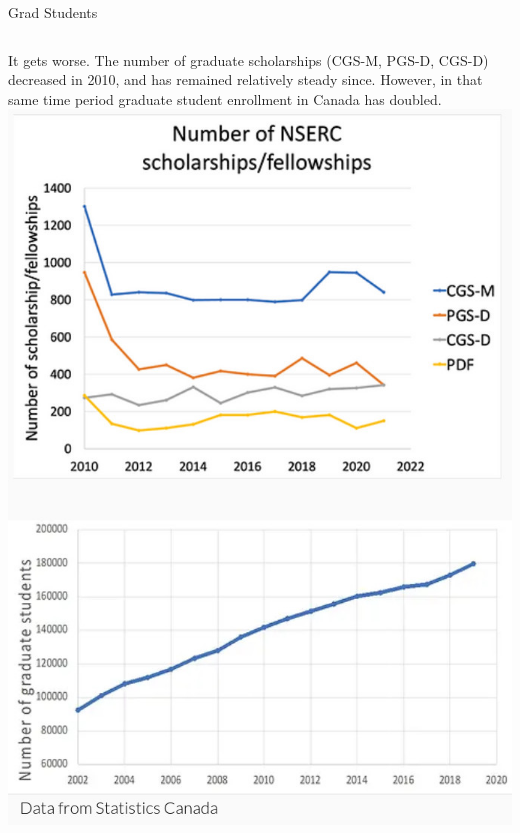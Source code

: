 \documentclass{beamer}
\begin{document}
\begin{frame}{Grad Students}
	\begin{columns}
		It gets worse. The number of graduate scholarships (CGS-M, PGS-D, CGS-D) decreased in 2010, and has remained relatively steady since. However, in that same time period graduate student enrollment in Canada has doubled.
		\includegraphics[width=1\textwidth]{../images/gradnumberscholarships.jpeg}
	\end{columns}
	
\end{frame}
\end{document}

